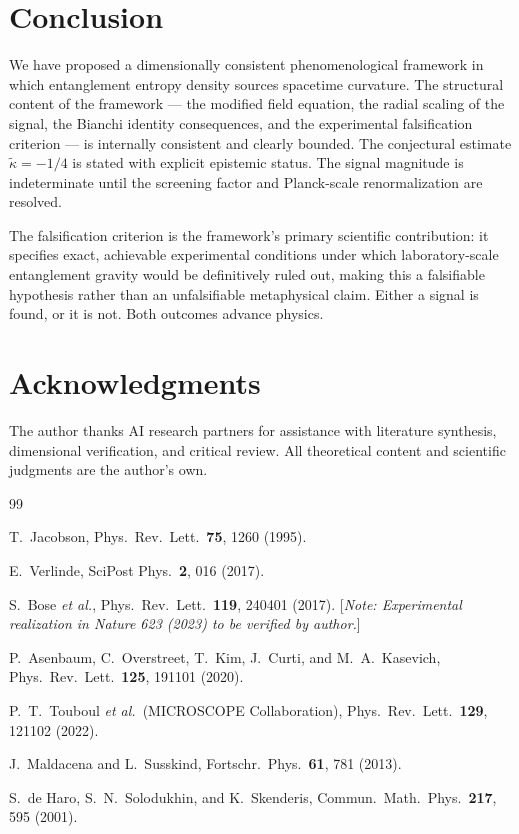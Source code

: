 \documentclass[12pt,twocolumn]{article}
\newcommand{\kt}{\tilde{\kappa}}
\begin{document}
\section{Conclusion}
\label{sec:conclusion}

We have proposed a dimensionally consistent phenomenological framework in which entanglement
entropy density sources spacetime curvature.  The structural content of the framework ---
the modified field equation, the radial scaling of the signal, the Bianchi identity
consequences, and the experimental falsification criterion --- is internally consistent and
clearly bounded.  The conjectural estimate $\kt = -1/4$ is stated with explicit epistemic
status.  The signal magnitude is indeterminate until the screening factor and
Planck-scale renormalization are resolved.

The falsification criterion is the framework's primary scientific contribution: it specifies
exact, achievable experimental conditions under which laboratory-scale entanglement gravity
would be definitively ruled out, making this a falsifiable hypothesis rather than an
unfalsifiable metaphysical claim.  Either a signal is found, or it is not.  Both outcomes
advance physics.

\section*{Acknowledgments}
The author thanks AI research partners for assistance with literature synthesis, dimensional
verification, and critical review.  All theoretical content and scientific judgments are the
author's own.


\begin{thebibliography}{99}

T.~Jacobson,
Phys.\ Rev.\ Lett.\ \textbf{75}, 1260 (1995).

E.~Verlinde,
SciPost Phys.\ \textbf{2}, 016 (2017).

S.~Bose \textit{et al.},
Phys.\ Rev.\ Lett.\ \textbf{119}, 240401 (2017).
[\textit{Note: Experimental realization in Nature 623 (2023) to be verified by author.}]

P.~Asenbaum, C.~Overstreet, T.~Kim, J.~Curti, and M.~A.~Kasevich,
Phys.\ Rev.\ Lett.\ \textbf{125}, 191101 (2020).

P.~T.~Touboul \textit{et al.}\ (MICROSCOPE Collaboration),
Phys.\ Rev.\ Lett.\ \textbf{129}, 121102 (2022).

J.~Maldacena and L.~Susskind,
Fortschr.\ Phys.\ \textbf{61}, 781 (2013).

S.~de Haro, S.~N.~Solodukhin, and K.~Skenderis,
Commun.\ Math.\ Phys.\ \textbf{217}, 595 (2001).

\end{thebibliography}
\end{document}
